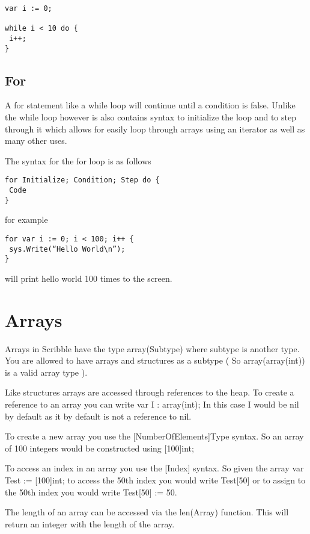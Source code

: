 \documentclass[]{final_report}
\begin{document}
\begin{verbatim}
var i := 0;

while i < 10 do {
 i++;
}
\end{verbatim}

\subsection{For}

A for statement like a while loop will continue until a condition is false. Unlike the while loop however is also contains syntax to initialize the loop and to step through it which allows for easily loop through arrays using an iterator as well as many other uses.

The syntax for the for loop is as follows

\begin{verbatim}
for Initialize; Condition; Step do {
 Code
}
\end{verbatim}

for example

\begin{verbatim}
for var i := 0; i < 100; i++ {
 sys.Write(“Hello World\n”);
}
\end{verbatim}

will print hello world 100 times to the screen.

\section{Arrays}

Arrays in Scribble have the type array(Subtype) where subtype is another type. You are allowed to have arrays and structures as a subtype ( So array(array(int)) is a valid array type ).

Like structures arrays are accessed through references to the heap. To create a reference to an array you can write var I : array(int); In this case I would be nil by default as it by default is not a reference to nil.

To create a new array you use the [NumberOfElements]Type syntax. So an array of 100 integers would be constructed using [100]int;

To access an index in an array you use the [Index] syntax. So given the array var Test := [100]int; to access the 50th index you would write Test[50] or to assign to the 50th index you would write Test[50] := 50.

The length of an array can be accessed via the len(Array) function. This will return an integer with the length of the array.
\end{document}
